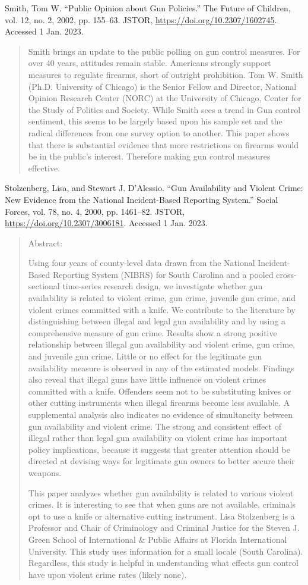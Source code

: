 \documentclass [12pt]{article}
\newcommand{\bibent}{\noindent \hangindent 40pt}
\newcommand{\bibannote}{\begin{quotation}}
\newcommand{\bibendote}{\end{quotation}}
\begin{document}
\bibent Smith, Tom W. “Public Opinion about Gun Policies.” The Future of Children, vol. 12, no. 2, 2002, pp. 155–63. JSTOR, \url{https://doi.org/10.2307/1602745}. Accessed 1 Jan. 2023.
\bibannote
Smith brings an update to the public polling on gun control measures. For over 40 years, attitudes remain stable. Americans strongly support measures to regulate firearms, short of outright prohibition. Tom W. Smith (Ph.D. University of Chicago) is the Senior Fellow and Director, National Opinion Research Center (NORC) at the University of Chicago, Center for the Study of Politics and Society. While Smith sees a trend in Gun control sentiment, this seems to be largely based upon his sample set and the radical differences from one survey option to another. This paper shows that there is substantial evidence that more restrictions on firearms would be in the public's interest. Therefore making gun control measures effective. 
\bibendote

\bibent Stolzenberg, Lisa, and Stewart J. D’Alessio. “Gun Availability and Violent Crime: New Evidence from the National Incident-Based Reporting System.” Social Forces, vol. 78, no. 4, 2000, pp. 1461–82. JSTOR, \url{https://doi.org/10.2307/3006181}. Accessed 1 Jan. 2023.
\bibannote
Abstract: \par Using four years of county-level data drawn from the National Incident-Based Reporting System (NIBRS) for South Carolina and a pooled cross-sectional time-series research design, we investigate whether gun availability is related to violent crime, gun crime, juvenile gun crime, and violent crimes committed with a knife. We contribute to the literature by distinguishing between illegal and legal gun availability and by using a comprehensive measure of gun crime. Results show a strong positive relationship between illegal gun availability and violent crime, gun crime, and juvenile gun crime. Little or no effect for the legitimate gun availability measure is observed in any of the estimated models. Findings also reveal that illegal guns have little influence on violent crimes committed with a knife. Offenders seem not to be substituting knives or other cutting instruments when illegal firearms become less available. A supplemental analysis also indicates no evidence of simultaneity between gun availability and violent crime. The strong and consistent effect of illegal rather than legal gun availability on violent crime has important policy implications, because it suggests that greater attention should be directed at devising ways for legitimate gun owners to better secure their weapons. \par
This paper analyzes whether gun availability is related to various violent crimes. It is interesting to see that when guns are not available, criminals opt to use a knife or alternative cutting instrument. Lisa Stolzenberg is a Professor and Chair of Criminology and Criminal Justice for the Steven J. Green School of International \& Public Affairs at Florida International University. This study uses information for a small locale (South Carolina). Regardless, this study is helpful in understanding what effects gun control have upon violent crime rates (likely none).
\bibendote
\end{document}
